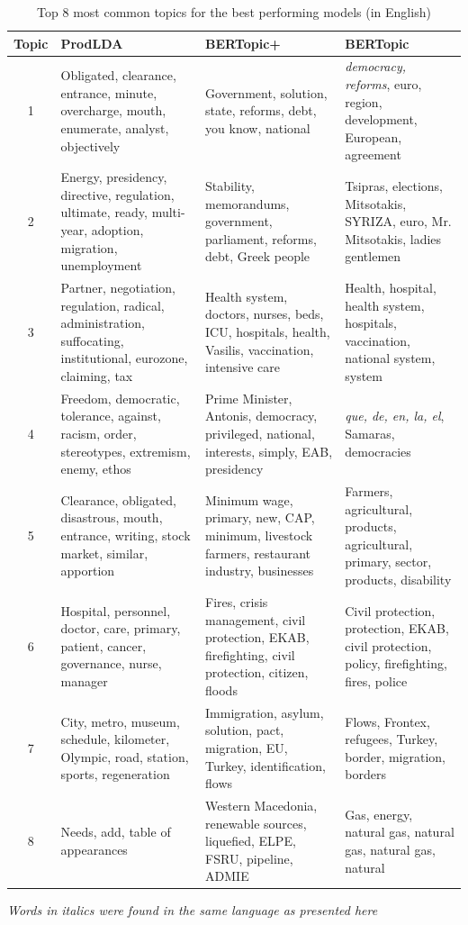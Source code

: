 \begin{table}[H]
\caption{Top 8 most common topics for the best performing models (in English)}
{\footnotesize 
\begin{tabular}{|c|m{4cm}|m{4cm}|m{4cm}|}
\hline
\textbf{Topic} & \textbf{ProdLDA} & \textbf{BERTopic+} & \textbf{BERTopic} \\
\hline
1 & Obligated, clearance, entrance, minute, overcharge, mouth, enumerate, analyst, objectively & Government, solution, state, reforms, debt, you know, national & \textit{democracy, reforms}, euro, region, development, European, agreement \\
\hline
2 & Energy, presidency, directive, regulation, ultimate, ready, multi-year, adoption, migration, unemployment & Stability, memorandums, government, parliament, reforms, debt, Greek people & Tsipras, elections, Mitsotakis, SYRIZA, euro, Mr. Mitsotakis, ladies gentlemen \\
\hline
3 & Partner, negotiation, regulation, radical, administration, suffocating, institutional, eurozone, claiming, tax & Health system, doctors, nurses, beds, ICU, hospitals, health, Vasilis, vaccination, intensive care & Health, hospital, health system, hospitals, vaccination, national system, system \\
\hline
4 & Freedom, democratic, tolerance, against, racism, order, stereotypes, extremism, enemy, ethos & Prime Minister, Antonis, democracy, privileged, national, interests, simply, EAB, presidency & \textit{que, de, en, la, el}, Samaras, democracies \\
\hline
5 & Clearance, obligated, disastrous, mouth, entrance, writing, stock market, similar, apportion & Minimum wage, primary, new, CAP, minimum, livestock farmers, restaurant industry, businesses & Farmers, agricultural, products, agricultural, primary, sector, products, disability \\
\hline
6 & Hospital, personnel, doctor, care, primary, patient, cancer, governance, nurse, manager & Fires, crisis management, civil protection, EKAB, firefighting, civil protection, citizen, floods & Civil protection, protection, EKAB, civil protection, policy, firefighting, fires, police \\
\hline
7 & City, metro, museum, schedule, kilometer, Olympic, road, station, sports, regeneration & Immigration, asylum, solution, pact, migration, EU, Turkey, identification, flows & Flows, Frontex, refugees, Turkey, border, migration, borders \\
\hline
8 & Needs, add, table of appearances & Western Macedonia, renewable sources, liquefied, ELPE, FSRU, pipeline, ADMIE & Gas, energy, natural gas, natural gas, natural gas, natural \\
\hline
\end{tabular}}
\begin{tablenotes}
\small
\item \textit{Words in italics were found in the same language as presented here}
\end{tablenotes}
\label{appTab:english_topics}
\end{table}